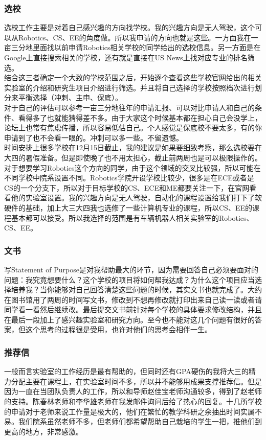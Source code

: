 \documentclass[a4paper,UTF8]{book}
\begin{document}
        \subsubsection*{选校}
        选校工作主要是对着自己感兴趣的方向找学校。我的兴趣方向是无人驾驶，这个可以从Robotics、CS、EE的角度做。所以我申请的方向也就是这些。一方面我在一亩三分地里面找以前申请Robotics相关学校的同学给出的选校信息。另一方面是在Google上直接搜索相关的学校，还有就是直接在US News上找对应专业的排名筛选。\\
        结合这三者确定一个大致的学校范围之后，开始逐个查看这些学校官网给出的相关实验室的介绍和研究生项目介绍进行筛选。并且将自己选择的学校按照档次进行划分来平衡选择（冲刺、主申、保底）。\\
        对于自己的评估可以参考一亩三分地往年的申请汇报、可以对比申请人和自己的条件、看得多了也就能猜得差不多。由于大家这个时候基本都在担心自己会没学上，论坛上也常有焦虑传播，所以容易低估自己。个人感觉是保底校不要太多，有的你申请到了也不会看一眼的。冲刺可以多一些。不留遗憾。\\
        时间安排上很多学校在12月15日截止，我的建议是如果要细致考察，那么选校要在大四的暑假准备。但是即使晚了也不用太担心，截止前两周也是可以极限操作的。\\
        对于想要学习Robotics这个方向的同学，由于这个领域的交叉比较强，所以可能在不同学校中院系设置不同。Robotics学院开设学校比较少，很多是在ECE或者是CS的一个分支下，所以对于目标学校的CS、ECE和ME都要关注一下，在官网看看他的实验室设置。我的兴趣方向是无人驾驶，自动化的课程设置给我们打下了软硬件的基础，加上大三大四我也选修了一些计算机专业的课程，所以CS、EE的课程基本都可以接受。所以我选择的范围是有车辆机器人相关实验室的Robotics、CS、EE。
        
        \subsubsection*{文书}
        写Statement of Purpose是对我帮助最大的环节，因为需要回答自己必须要面对的问题：我究竟想要什么？这个学校的项目将如何帮我达成？为什么这个项目应当选择培养我？当你能够对自己回答清楚这些问题的时候，其实文书也就完成了。大约在图书馆用了两周的时间写文书，修改到不想再修改就打印出来自己读一读或者请同学看一看然后继续改。最后提交文书前针对每个学校的具体要求修改结构，并且在最后一段加上了感兴趣实验室和研究方向。至今也不能对这几个问题有很好的答案，但这个思考的过程很是受用，也许对他们的思考会相伴一生。

        \subsubsection*{推荐信}
        一般而言实验室的工作经历是最有帮助的，但同时还有GPA硬伤的我将大三的精力分配主要在课程上，在实验室时间不多，所以并不能够用成果支撑推荐信。但是因为一直在当团队负责人的工作，所以和导师赵佳宝老师沟通较多，得到了赵老师的支持。陈春林老师和李华雄老师在我发邮件询问后给了热心的回复。十几所学校的申请对于老师来说工作量是极大的，他们在繁忙的教学科研之余抽出时间实属不易。我们院系虽然老师不多，但老师们都希望帮助自己栽培的学生一把，推他们到更高的地方，非常感激。
\end{document}
